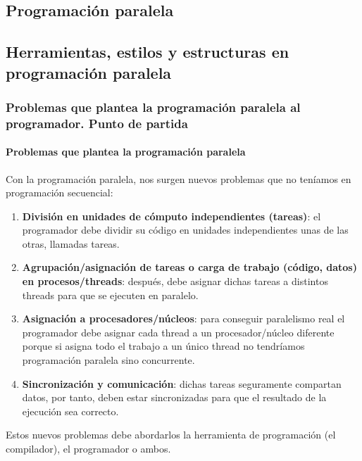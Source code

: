 \documentclass[10pt,a4paper,spanish]{report}
\begin{document}
\textcolor[rgb]{0.2,0.4,0.8}{\chapter{Programación paralela}}
\setcounter{section}{3}
\textcolor[rgb]{0.2,0.4,0.8}{\section{Herramientas, estilos y estructuras en programación paralela}}
\textcolor[rgb]{0.2,0.4,0.8}{\subsection{Problemas que plantea la programación paralela al programador. Punto de partida}}
\textcolor[rgb]{0.2,0.4,0.8}{\subsubsection{Problemas que plantea la programación paralela}}
Con la programación paralela, nos surgen nuevos problemas que no teníamos en programación secuencial:
\begin{enumerate}[\color{azul}{\bf $\heartsuit$}]
    \item \textcolor[rgb]{0.2,0.4,0.8}{\textbf{División en unidades de cómputo independientes (tareas)}}: el programador debe dividir su código en unidades independientes unas de las otras, llamadas tareas.
    \item \textcolor[rgb]{0.2,0.4,0.8}{\textbf{Agrupación/asignación de tareas o carga de trabajo (código, datos) en procesos/threads}}: después, debe asignar dichas tareas a distintos threads para que se ejecuten en paralelo.
    \item \textcolor[rgb]{0.2,0.4,0.8}{\textbf{Asignación a procesadores/núcleos}}: para conseguir paralelismo real el programador debe asignar cada thread a un procesador/núcleo diferente porque si asigna todo el trabajo a un único thread no tendríamos programación paralela sino concurrente.
    \item \textcolor[rgb]{0.2,0.4,0.8}{\textbf{Sincronización y comunicación}}: dichas tareas seguramente compartan datos, por tanto, deben estar sincronizadas para que el resultado de la ejecución sea correcto.
\end{enumerate}

Estos nuevos problemas debe abordarlos la herramienta de programación (el compilador), el programador o ambos.
\end{document}
